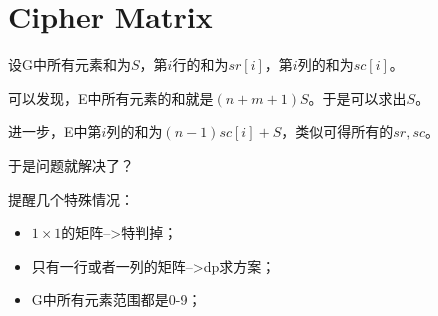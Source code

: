 \section{Cipher Matrix}
设G中所有元素和为$S$，第$i$行的和为$sr[i]$，第$i$列的和为$sc[i]$。\par
可以发现，E中所有元素的和就是$(n+m+1)S$。于是可以求出$S$。\par
进一步，E中第$i$列的和为$(n-1)sc[i] + S$，类似可得所有的$sr,sc$。\par
于是问题就解决了？\par
提醒几个特殊情况：
\begin{itemize}
\item $1 \times 1$的矩阵-->特判掉；
\item 只有一行或者一列的矩阵-->dp求方案；
\item G中所有元素范围都是0-9；
\end{itemize}
